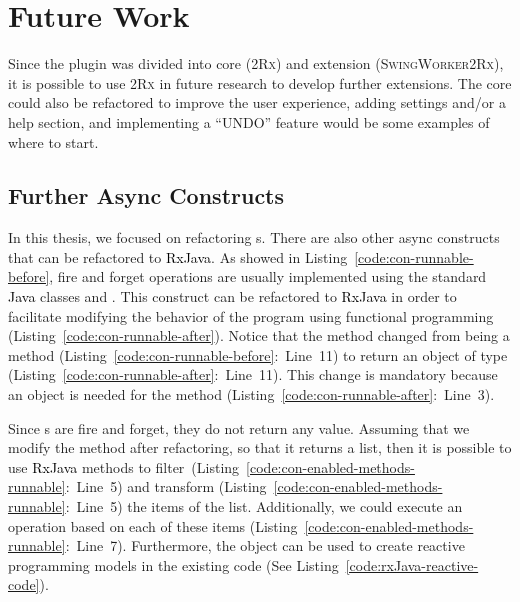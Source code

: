 \documentclass[type=bsc,accentcolor=tud9c]{tudthesis}
\newcommand{\framework}[1]{\textcolor{black}{#1}}
\newcommand{\toolcore}{\textsc{2Rx}}
\newcommand{\toolextension}{\textsc{SwingWorker2Rx}}
\begin{document}
\section{Future Work}

Since the plugin was divided into core (\toolcore{}) and extension (\toolextension{}), it is possible to use \toolcore{} in future research to develop further extensions. The core could also be refactored to improve the user experience, adding settings and/or a help section, and implementing a ``UNDO'' feature would be some examples of where to start.

\subsection{Further Async Constructs}
In this thesis, we focused on refactoring s. There are also other async constructs that can be refactored to \framework{RxJava}. As showed in Listing~\ref{code:con-runnable-before}, fire and forget operations are usually implemented using the standard \framework{Java} classes  and . This construct can be refactored to \framework{RxJava} in order to facilitate modifying the behavior of the program using functional programming (Listing~\ref{code:con-runnable-after}). Notice that the method  changed from being a  method (Listing~\ref{code:con-runnable-before}:~Line~11) to return an object of type  (Listing~\ref{code:con-runnable-after}:~Line~11). This change is mandatory because an object is needed for the method  (Listing~\ref{code:con-runnable-after}:~Line~3).



Since s are fire and forget, they do not return any value. Assuming that we modify the method  after refactoring, so that it returns a list, then it is possible to use \framework{RxJava} methods to filter~(Listing~\ref{code:con-enabled-methods-runnable}:~Line~5) and transform (Listing~\ref{code:con-enabled-methods-runnable}:~Line~5) the items of the list. Additionally, we could execute an operation based on each of these items (Listing~\ref{code:con-enabled-methods-runnable}:~Line~7). Furthermore, the  object can be used to create reactive programming models in the existing code (See Listing~\ref{code:rxJava-reactive-code}).


\end{document}
